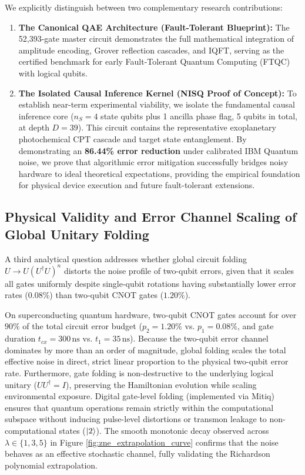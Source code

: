 We explicitly distinguish between two complementary research contributions:
\begin{enumerate}
    \item \textbf{The Canonical QAE Architecture (Fault-Tolerant Blueprint):} The 52,393-gate master circuit demonstrates the full mathematical integration of amplitude encoding, Grover reflection cascades, and IQFT, serving as the certified benchmark for early Fault-Tolerant Quantum Computing (FTQC) with logical qubits.
    \item \textbf{The Isolated Causal Inference Kernel (NISQ Proof of Concept):} To establish near-term experimental viability, we isolate the fundamental causal inference core ($n_S = 4$ state qubits plus 1 ancilla phase flag, 5 qubits in total, at depth $D = 39$). This circuit contains the representative exoplanetary photochemical CPT cascade and target state entanglement. By demonstrating an \textbf{86.44\% error reduction} under calibrated IBM Quantum noise, we prove that algorithmic error mitigation successfully bridges noisy hardware to ideal theoretical expectations, providing the empirical foundation for physical device execution and future fault-tolerant extensions.
\end{enumerate}

\subsection{Physical Validity and Error Channel Scaling of Global Unitary Folding}
A third analytical question addresses whether global circuit folding $U \to U (U^\dagger U)^n$ distorts the noise profile of two-qubit errors, given that it scales all gates uniformly despite single-qubit rotations having substantially lower error rates ($0.08\%$) than two-qubit CNOT gates ($1.20\%$).

On superconducting quantum hardware, two-qubit CNOT gates account for over $90\%$ of the total circuit error budget ($p_2 = 1.20\%$ vs. $p_1 = 0.08\%$, and gate duration $t_{cx} = 300\,\mathrm{ns}$ vs. $t_1 = 35\,\mathrm{ns}$). Because the two-qubit error channel dominates by more than an order of magnitude, global folding scales the total effective noise in direct, strict linear proportion to the physical two-qubit error rate. Furthermore, gate folding is non-destructive to the underlying logical unitary ($U U^\dagger = I$), preserving the Hamiltonian evolution while scaling environmental exposure. Digital gate-level folding (implemented via Mitiq) ensures that quantum operations remain strictly within the computational subspace without inducing pulse-level distortions or transmon leakage to non-computational states ($\left|2\right\rangle$). The smooth monotonic decay observed across $\lambda \in \{1, 3, 5\}$ in Figure \ref{fig:zne_extrapolation_curve} confirms that the noise behaves as an effective stochastic channel, fully validating the Richardson polynomial extrapolation.
